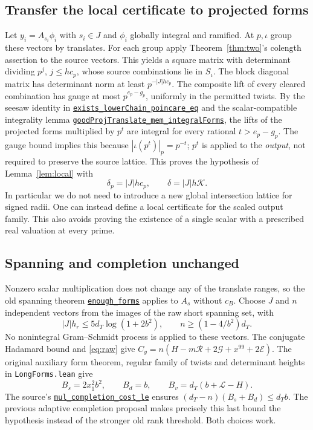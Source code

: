 \documentclass[11pt,letterpaper]{article}
\theoremstyle{remark}\newtheorem{remark}[theorem]{Remark}
\newcommand{\R}{\mathcal R}\newcommand{\E}{\mathcal E}\newcommand{\Lfour}{\mathcal L}\newcommand{\K}{\mathcal K}\newcommand{\G}{\mathcal G}\newcommand{\Gr}{\operatorname{Gram}}\newcommand{\rk}{\operatorname{rank}}\newcommand{\Height}{\operatorname{HeightLe}}
\newcommand{\src}[3]{\href{https://github.com/VladimirReshetnikov/ProveIt/blob/89d12dd40424f1217fd818d84877b3da52396a3b/Analysis/GeneralizedRiemannHypothesis/Lean/grh/src/#1.lean\#L#2}{\texttt{#3}}}
\begin{document}
\subsection{Transfer the local certificate to projected forms}
Let $y_i=A_{s_i}\phi_i$ with $s_i\in J$ and $\phi_i$ globally integral and ramified. At $p,\iota$ group these vectors by translates. For each group apply Theorem~\ref{thm:two}'s colength assertion to the source vectors. This yields a square matrix with determinant dividing $p^j$, $j\le hc_p$, whose source combinations lie in $S_\iota$. The block diagonal matrix has determinant norm at least $p^{-|J|hc_p}$. The composite lift of every cleared combination has gauge at most $p^{e_p-g_p}$, uniformly in the permitted twists. By the seesaw identity in \src{New/Reduction/ShortAndEnough}{217}{exists\_lowerChain\_poincare\_eq} and the scalar-compatible integrality lemma \src{New/UpperBound/Size/ArchimedeanSize}{497}{goodProjTranslate\_mem\_integralForms}, the lifts of the projected forms multiplied by $p^t$ are integral for every rational $t>e_p-g_p$. The gauge bound implies this because $|\iota(p^t)|_p=p^{-t}$; $p^t$ is applied to the \emph{output}, not required to preserve the source lattice. This proves the hypothesis of Lemma~\ref{lem:local} with
\begin{equation}\label{eq:delta}
 \delta_p=|J|hc_p,\qquad \delta=|J|h\K.
\end{equation}
In particular we do not need to introduce a new global intersection lattice for signed radii. One can instead define a local certificate for the scaled output family. This also avoids proving the existence of a single scalar with a prescribed real valuation at every prime.

\subsection{Spanning and completion unchanged}
Nonzero scalar multiplication does not change any of the translate ranges, so the old spanning theorem \src{New/Reduction/ShortAndEnough}{448}{enough\_forms} applies to $A_s$ without $c_B$. Choose $J$ and $n$ independent vectors from the images of the raw short spanning set, with
\begin{equation}\label{eq:oldB}
 |J|h_r\le5d_T\log(1+2b^2),\qquad n\ge(1-4/b^2)d_T.
\end{equation}
No nonintegral Gram--Schmidt process is applied to these vectors. The conjugate Hadamard bound and \eqref{eq:raw} give $C_y=n(H-m\R+2\G+x^{99}+2\E)$. The original auxiliary form theorem, regular family of twists and determinant heights in \texttt{LongForms.lean} give
\begin{equation}\label{eq:Cinputs}
 B_s=2x_1^2b^2,\qquad B_d=b,\qquad B_v=d_T(b+\Lfour-H).
\end{equation}
The source's \src{New/Determinant/Twist/LongForms}{120}{mul\_completion\_cost\_le} ensures $(d_T-n)(B_s+B_d)\le d_T b$. The previous adaptive completion proposal makes precisely this last bound the hypothesis instead of the stronger old rank threshold. Both choices work.
\end{document}
